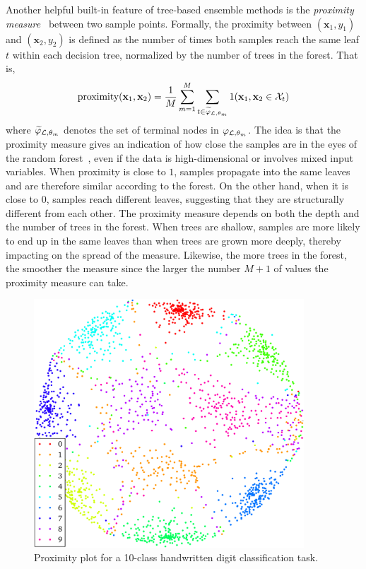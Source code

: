 Another helpful built-in feature of tree-based ensemble methods is the
\textit{proximity measure}~\citep{breiman:2002} between two sample points. Formally, the proximity
between $(\mathbf{x}_1, y_1)$ and $(\mathbf{x}_2, y_2)$ is defined as the
number of times both samples reach the same leaf $t$ within each decision tree,
normalized by the number of trees in the forest. That is,
\begin{equation}
\text{proximity}(\mathbf{x}_1, \mathbf{x}_2) = \frac{1}{M} \sum_{m=1}^M \sum_{t \in \widetilde{\varphi}_{{\cal L},\theta_m}} 1(\mathbf{x}_1 , \mathbf{x}_2 \in {\cal X}_t)
\end{equation}
where $\widetilde{\varphi}_{{\cal L},\theta_m}$ denotes the set of terminal
nodes in $\varphi_{{\cal L},\theta_m}$. The idea is that the proximity measure
gives an indication of how close the  samples are in the eyes of the random
forest~\citep{hastie:2005}, even if the data is high-dimensional or involves
mixed input variables. When proximity is close to $1$, samples propagate into
the same leaves and are therefore similar according to the forest. On the other
hand, when it is close to $0$, samples reach different leaves, suggesting that
they are structurally different from each other. The proximity measure
depends on both the depth and the number of trees in the forest.
When trees are shallow, samples are more likely to end up in the same leaves
than when trees are grown more deeply, thereby impacting on the spread of the measure.
Likewise, the more trees in the forest, the smoother the measure since
the larger the number $M+1$ of values the proximity measure can take.

\begin{figure}
    \centering
    \includegraphics[width=0.9\textwidth]{figures/ch4_proximity_plot.pdf}
    \caption{Proximity plot for a 10-class handwritten digit classification task.}
    \label{fig:proximity-plot}
\end{figure}

